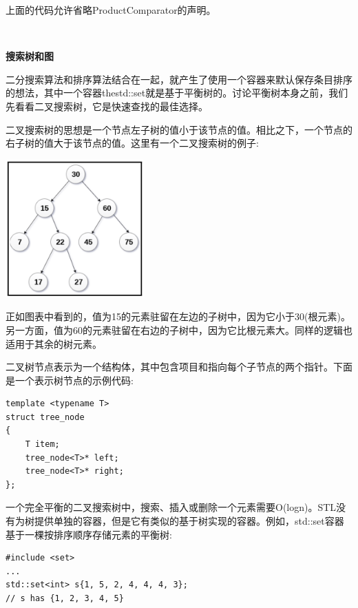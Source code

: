 上面的代码允许省略ProductComparator的声明。 \par

\noindent\textbf{}\ \par
\textbf{搜索树和图} \ \par
二分搜索算法和排序算法结合在一起，就产生了使用一个容器来默认保存条目排序的想法，其中一个容器thestd::set就是基于平衡树的。讨论平衡树本身之前，我们先看看二叉搜索树，它是快速查找的最佳选择。 \par
二叉搜索树的思想是一个节点左子树的值小于该节点的值。相比之下，一个节点的右子树的值大于该节点的值。这里有一个二叉搜索树的例子: \par

\begin{center}
	\includegraphics[width=0.4\textwidth]{content/Section-2/Chapter-6/24}
\end{center}

正如图表中看到的，值为15的元素驻留在左边的子树中，因为它小于30(根元素)。另一方面，值为60的元素驻留在右边的子树中，因为它比根元素大。同样的逻辑也适用于其余的树元素。 \par
二叉树节点表示为一个结构体，其中包含项目和指向每个子节点的两个指针。下面是一个表示树节点的示例代码: \par

\begin{lstlisting}[caption={}]
template <typename T>
struct tree_node
{
	T item;
	tree_node<T>* left;
	tree_node<T>* right;
};
\end{lstlisting}

一个完全平衡的二叉搜索树中，搜索、插入或删除一个元素需要O(logn)。STL没有为树提供单独的容器，但是它有类似的基于树实现的容器。例如，std::set容器基于一棵按排序顺序存储元素的平衡树: \par

\begin{lstlisting}[caption={}]
#include <set>
...
std::set<int> s{1, 5, 2, 4, 4, 4, 3};
// s has {1, 2, 3, 4, 5}
\end{lstlisting}

